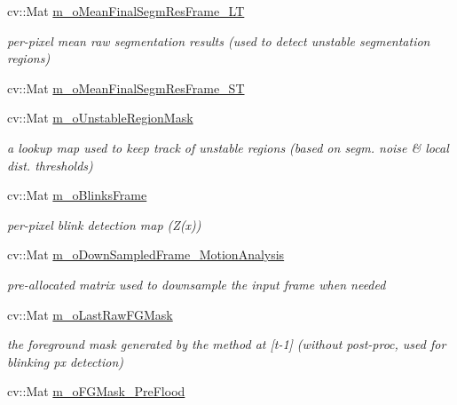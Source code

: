 \begin{DoxyCompactItemize}
\item 
cv\+::\+Mat \mbox{\hyperlink{class_background_subtractor_su_b_s_e_n_s_e_ad48e92b6d6bbce34f9f452484bc9956a}{m\+\_\+o\+Mean\+Final\+Segm\+Res\+Frame\+\_\+\+LT}}
\begin{DoxyCompactList}\small\item\em per-\/pixel mean raw segmentation results (used to detect unstable segmentation regions) \end{DoxyCompactList}\item 
cv\+::\+Mat \mbox{\hyperlink{class_background_subtractor_su_b_s_e_n_s_e_a0dcd4f5df8adb9b4fa630a9a6f6b5e30}{m\+\_\+o\+Mean\+Final\+Segm\+Res\+Frame\+\_\+\+ST}}
\item 
cv\+::\+Mat \mbox{\hyperlink{class_background_subtractor_su_b_s_e_n_s_e_acfaf4c3c5aedbed8bd302444b4a4f8dd}{m\+\_\+o\+Unstable\+Region\+Mask}}
\begin{DoxyCompactList}\small\item\em a lookup map used to keep track of unstable regions (based on segm. noise \& local dist. thresholds) \end{DoxyCompactList}\item 
cv\+::\+Mat \mbox{\hyperlink{class_background_subtractor_su_b_s_e_n_s_e_a943b50c63d233c0948d82b64390f1aa1}{m\+\_\+o\+Blinks\+Frame}}
\begin{DoxyCompactList}\small\item\em per-\/pixel blink detection map (\textquotesingle{}Z(x)\textquotesingle{}) \end{DoxyCompactList}\item 
cv\+::\+Mat \mbox{\hyperlink{class_background_subtractor_su_b_s_e_n_s_e_a619bc3f0bfcd408796d1ffd6bd45d04d}{m\+\_\+o\+Down\+Sampled\+Frame\+\_\+\+Motion\+Analysis}}
\begin{DoxyCompactList}\small\item\em pre-\/allocated matrix used to downsample the input frame when needed \end{DoxyCompactList}\item 
cv\+::\+Mat \mbox{\hyperlink{class_background_subtractor_su_b_s_e_n_s_e_a11c86236e9d141d711163c170a8bf0d6}{m\+\_\+o\+Last\+Raw\+F\+G\+Mask}}
\begin{DoxyCompactList}\small\item\em the foreground mask generated by the method at \mbox{[}t-\/1\mbox{]} (without post-\/proc, used for blinking px detection) \end{DoxyCompactList}\item 
cv\+::\+Mat \mbox{\hyperlink{class_background_subtractor_su_b_s_e_n_s_e_a53ac4868e46e0ba382a0e6d769e8a961}{m\+\_\+o\+F\+G\+Mask\+\_\+\+Pre\+Flood}}

\end{DoxyCompactItemize}

